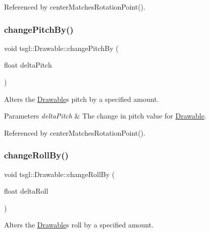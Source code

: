 Referenced by center\+Matches\+Rotation\+Point().

\mbox{\label{classtsgl_1_1_drawable_a5cf7b8412046388eec3e518e99991646}} 
\subsubsection{\texorpdfstring{change\+Pitch\+By()}{changePitchBy()}}
{\footnotesize\ttfamily void tsgl\+::\+Drawable\+::change\+Pitch\+By (\begin{DoxyParamCaption}\item[{float}]{delta\+Pitch }\end{DoxyParamCaption})\hspace{0.3cm}{\ttfamily [virtual]}}



Alters the \hyperlink{classtsgl_1_1_drawable}{Drawable}\textquotesingle{}s pitch by a specified amount. 


\begin{DoxyParams}{Parameters}
{\em delta\+Pitch} & The change in pitch value for \hyperlink{classtsgl_1_1_drawable}{Drawable}. \\
\hline
\end{DoxyParams}


Referenced by center\+Matches\+Rotation\+Point().

\mbox{\label{classtsgl_1_1_drawable_add43efbe60acaab91cf425facc68363a}} 
\subsubsection{\texorpdfstring{change\+Roll\+By()}{changeRollBy()}}
{\footnotesize\ttfamily void tsgl\+::\+Drawable\+::change\+Roll\+By (\begin{DoxyParamCaption}\item[{float}]{delta\+Roll }\end{DoxyParamCaption})\hspace{0.3cm}{\ttfamily [virtual]}}



Alters the \hyperlink{classtsgl_1_1_drawable}{Drawable}\textquotesingle{}s roll by a specified amount. 


